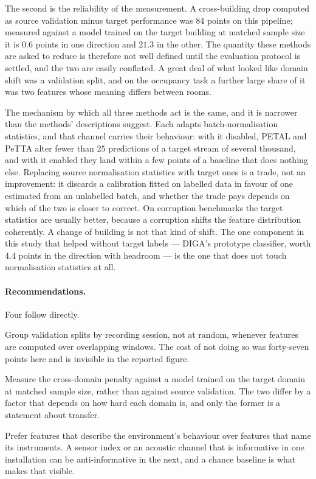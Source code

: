\documentclass[a4paper,fleqn]{cas-dc}
\begin{document}
The second is the reliability of the measurement. A cross-building drop computed as source
validation minus target performance was $84$ points on this pipeline; measured against a
model trained on the target building at matched sample size it is $0.6$ points in one
direction and $21.3$ in the other. The quantity these methods are asked to reduce is
therefore not well defined until the evaluation protocol is settled, and the two are easily
conflated. A great deal of what looked like domain shift was a validation split, and on the
occupancy task a further large share of it was two features whose meaning differs between
rooms.

The mechanism by which all three methods act is the same, and it is narrower than the
methods' descriptions suggest. Each adapts batch-normalisation statistics, and that channel
carries their behaviour: with it disabled, PETAL and PeTTA alter fewer than $25$
predictions of a target stream of several thousand, and with it enabled they land within a
few points of a baseline that does
nothing else. Replacing source normalisation statistics with target ones is a trade, not an
improvement: it discards a calibration fitted on labelled data in favour of one estimated
from an unlabelled batch, and whether the trade pays depends on which of the two is closer
to correct. On corruption benchmarks the target statistics are usually better, because a
corruption shifts the feature distribution coherently. A change of building is not that
kind of shift. The one component in this study that helped without target labels --- DIGA's
prototype classifier, worth $4.4$ points in the direction with headroom --- is the one that
does not touch normalisation statistics at all.

\paragraph{Recommendations.} Four follow directly.

Group validation splits by recording session, not at random, whenever features are computed
over overlapping windows. The cost of not doing so was forty-seven points here and is
invisible in the reported figure.

Measure the cross-domain penalty against a model trained on the target domain at matched
sample size, rather than against source validation. The two differ by a factor that depends
on how hard each domain is, and only the former is a statement about transfer.

Prefer features that describe the environment's behaviour over features that name its
instruments. A sensor index or an acoustic channel that is informative in one installation
can be anti-informative in the next, and a chance baseline is what makes that visible.
\end{document}
